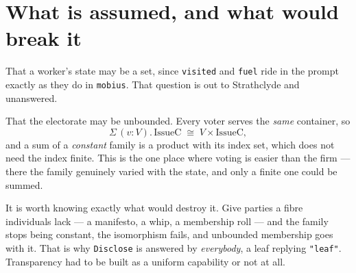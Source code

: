 \documentclass[11pt,a4paper]{article}
\begin{document}
\section{What is assumed, and what would break it}

That a worker's state may be a set, since \texttt{visited} and \texttt{fuel}
ride in the prompt exactly as they do in \texttt{mobius}. That question is out to
Strathclyde and unanswered.

That the electorate may be unbounded. Every voter serves the \emph{same}
container, so
\[
  \Sigma\,(v : V).\,\mathrm{IssueC} \;\cong\; V \times \mathrm{IssueC},
\]
and a sum of a \emph{constant} family is a product with its index set, which does
not need the index finite. This is the one place where voting is easier than the
firm --- there the family genuinely varied with the state, and only a finite one
could be summed.

It is worth knowing exactly what would destroy it. Give parties a fibre
individuals lack --- a manifesto, a whip, a membership roll --- and the family
stops being constant, the isomorphism fails, and unbounded membership goes with
it. That is why \texttt{Disclose} is answered by \emph{everybody}, a leaf
replying \texttt{"leaf"}. Transparency had to be built as a uniform capability
or not at all.
\end{document}
